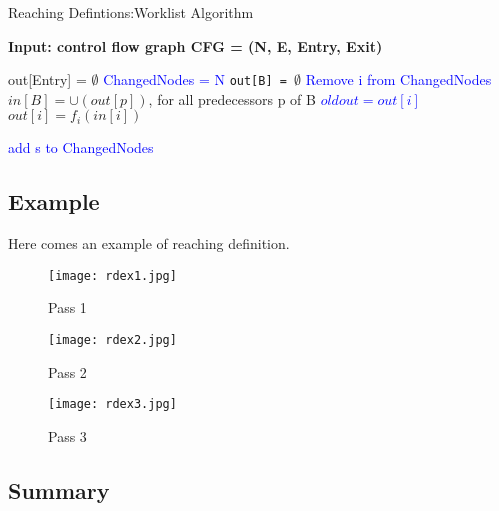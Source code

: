 \begin{algorithm}
	\caption{Reaching Defintions:Worklist Algorithm}\label{alg:reachingdefiterative}
	\hspace*{\algorithmicindent} \textbf{Input: control flow graph CFG = (N, E, Entry, Exit) } \\


	\begin{algorithmic}

		\State out[Entry] = $\emptyset$ 
		\State \textcolor{blue}{ChangedNodes = N}
		\State \texttt{out[B] = $\emptyset$} 
		\EndFor
		\State \textcolor{blue}{Remove i from ChangedNodes}
		\State $in[B] =  \cup (out[p])$, for all predecessors p of B
		\State \textcolor{blue}{$oldout = out[i]$}
		\State $out[i] = f_i(in[i])$ 

		\State \textcolor{blue}{add s to ChangedNodes}
		\EndFor
		\EndIf

		\EndWhile
	\end{algorithmic}
\end{algorithm}



\subsection{Example}
Here comes an example of reaching definition.

\begin{figure}[!htb]
	\texttt{[image: rdex1.jpg]}
	\caption{Pass 1}\label{fig:awesome_image1}
	\endminipage\hfill
	\texttt{[image: rdex2.jpg]}
	\caption{Pass 2}\label{fig:awesome_image2}
	\endminipage\hfill
	\texttt{[image: rdex3.jpg]}
	\caption{Pass 3}\label{fig:awesome_image3}
	\endminipage
\end{figure}


\subsection{Summary}

